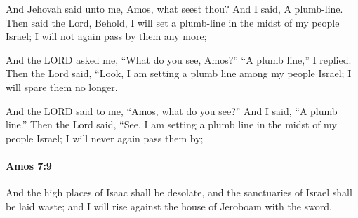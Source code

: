 			\begin{versebox}
					\item[BHS] 
					\item[LXX] 
					\item[ASV] And Jehovah said unto me, Amos, what seest thou? And I said, A plumb-line. Then said the Lord, Behold, I will set a plumb-line in the midst of my people Israel; I will not again pass by them any more;
					\item[NIV] And the LORD asked me, “What do you see, Amos?” “A plumb line,” I replied. Then the Lord said, “Look, I am setting a plumb line among my people Israel; I will spare them no longer.
					\item[NRSV] And the LORD said to me, “Amos, what do you see?” And I said, “A plumb line.” Then the Lord said, “See, I am setting a plumb line in the midst of my people Israel; I will never again pass them by;
			\end{versebox}

		\paragraph{Amos 7:9} %
			\label{AMOS-7-9}

			And the high places of Isaac shall be desolate, and the sanctuaries of Israel shall be laid waste; and I will rise against the house of Jeroboam with the sword.


